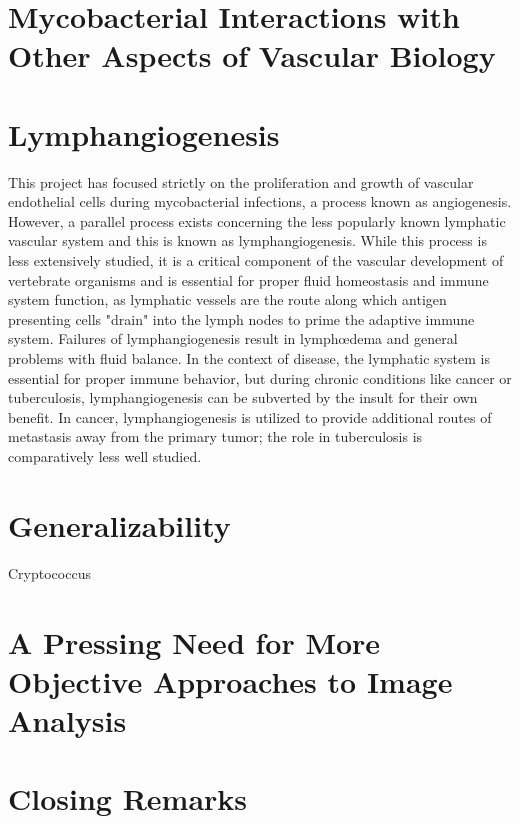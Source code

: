 \section{Mycobacterial Interactions with Other Aspects of Vascular Biology}

\citep{Correa2014}
\citep{ClaessonWelsh2015}
\citep{Eklund2017}
\citep{Oehlers2017}
\citep{Hato2008}
\citep{Sakamoto2010}
\citep{Keskin2015}
\citep{Shin2016}

\section{Lymphangiogenesis}

This project has focused strictly on the proliferation and growth of vascular endothelial cells during mycobacterial infections, a process known as angiogenesis. However, a parallel process exists concerning the less popularly known lymphatic vascular system and this is known as lymphangiogenesis. While this process is less extensively studied, it is a critical component of the vascular development of vertebrate organisms and is essential for proper fluid homeostasis and immune system function, as lymphatic vessels are the route along which antigen presenting cells "drain" into the lymph nodes to prime the adaptive immune system. Failures of lymphangiogenesis result in lymph\oe dema and general problems with fluid balance. In the context of disease, the lymphatic system is essential for proper immune behavior, but during chronic conditions like cancer or tuberculosis, lymphangiogenesis can be subverted by the insult for their own benefit. In cancer, lymphangiogenesis is utilized to provide additional routes of metastasis away from the primary tumor; the role in tuberculosis is comparatively less well studied.

\citep{Alitalo2005}
\citep{Bower2017a}
\citep{Bower2017b}
\citep{Bussmann2010}
\citep{Campuzano2017}
\citep{Dietrich2007}
\citep{Duong2012}
\citep{Hogan2009}
\citep{Wong2017b}
\citep{Makinen2001}
\citep{LeGuen2014}
\citep{Kuchler2006}
\citep{Haiko2008}
\citep{Stacker2014}
\citep{Nicenboim2015}
\citep{Onder2017}
\citep{Okuda2012}
\citep{Han2017}
\citep{Jung2017}
\citep{Harding2015}
\citep{vanLessen2017}
\citep{Shin2017}

\section{Generalizability}

Cryptococcus

\citep{Bojarczuk2016, Lin2006b}

\section{A Pressing Need for More Objective Approaches to Image Analysis}

\citep{Heath2017}


\section{Closing Remarks}
